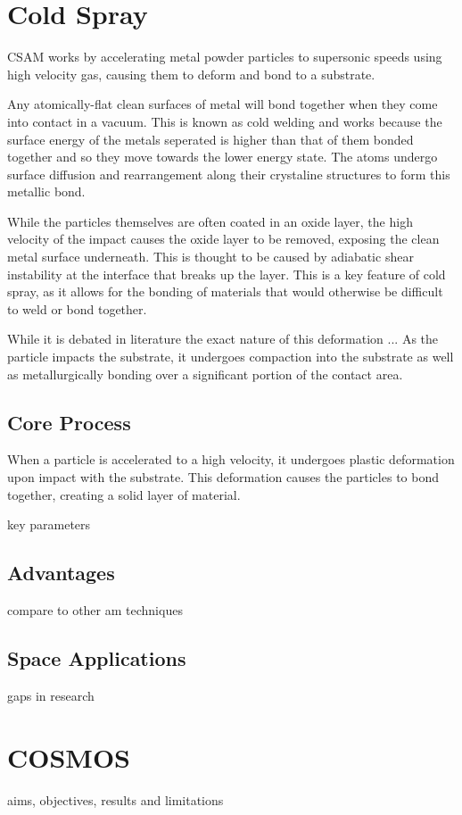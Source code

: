 \section{Cold Spray}
CSAM works by accelerating metal powder particles to supersonic speeds using high velocity gas, causing them to deform and bond to a substrate. 

Any atomically-flat clean surfaces of metal will bond together when they come into contact in a vacuum\cite{holzbauer2024}. This is known as cold welding and works because the surface energy of the metals seperated is higher than that of them bonded together and so they move towards the lower energy state. The atoms undergo surface diffusion and rearrangement along their crystaline structures\cite{ctx46070057700001591} to form this metallic bond. 

While the particles themselves are often coated in an oxide layer, the high velocity of the impact causes the oxide layer to be removed, exposing the clean metal surface underneath. This is thought to be caused by adiabatic shear instability at the interface that breaks up the layer\cite{assadi2016cold}. This is a key feature of cold spray, as it allows for the bonding of materials that would otherwise be difficult to weld or bond together.


While it is debated in literature the exact nature of this deformation ...
As the particle impacts the substrate, it undergoes compaction into the substrate as well as metallurgically bonding over a significant portion of the contact area.
\subsection{Core Process}
When a particle is accelerated to a high velocity, it undergoes plastic deformation upon impact with the substrate. This deformation causes the particles to bond together, creating a solid layer of material. 

key parameters
\subsection{Advantages}
compare to other am techniques
\subsection{Space Applications}

gaps in research

\section{COSMOS}
aims, objectives, results and limitations








